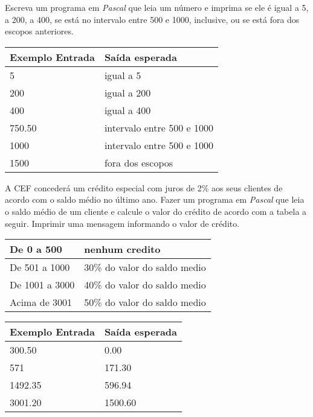 \item Escreva um programa em \emph{Pascal} que leia um número e imprima se 
ele é igual a 5, a 200, a 400, se está no intervalo entre 500 e 1000, 
inclusive, ou se está fora dos escopos anteriores.

\begin{center}
\begin{tabular}{|l|l|} \hline
Exemplo Entrada & Saída esperada \\ \hline
5                & igual a 5               \\ \hline
200                & igual a 200               \\ \hline
400                & igual a 400               \\ \hline
750.50                & intervalo entre 500 e 1000               \\ \hline
1000                & intervalo entre 500 e 1000               \\ \hline
1500                & fora dos escopos               \\ \hline
\end{tabular}
\end{center}

\item A CEF concederá um crédito especial com juros de 2\% aos seus clientes de 
acordo com o saldo médio no último ano. Fazer um programa em \emph{Pascal} que 
leia o saldo médio de um cliente e calcule o valor do crédito de acordo com a 
tabela a seguir. Imprimir uma mensagem informando o valor de crédito.

\begin{tabular}{|l|l|}\hline
De 0 a 500 & nenhum credito \\ \hline
De 501 a 1000 & 30\% do valor do saldo medio \\ \hline
De 1001 a 3000 & 40\% do valor do saldo medio \\ \hline
Acima de 3001 &  50\% do valor do saldo medio\\ \hline
\end{tabular}

\begin{center}
\begin{tabular}{|l|l|} \hline
Exemplo Entrada & Saída esperada \\ \hline
300.50                & 0.00                \\ \hline
571                & 171.30               \\ \hline
1492.35                & 596.94               \\ \hline
3001.20               &  1500.60               \\ \hline
\end{tabular}
\end{center}

